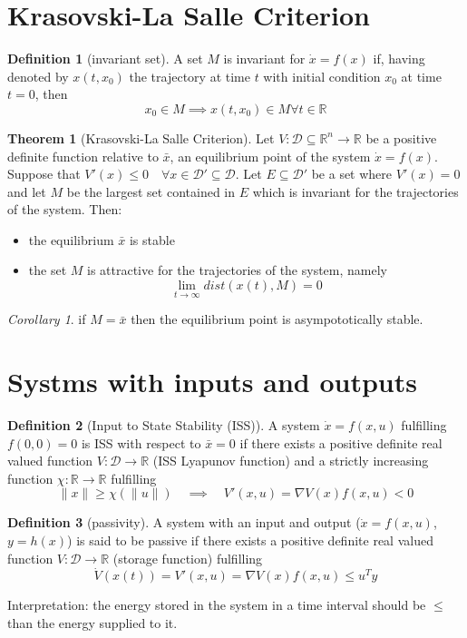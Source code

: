 \documentclass{book}
\newcommand{\R}{\mathbb{R}}
\theoremstyle{definition}
\newtheorem{definition}{Definition}[section]
\newtheorem{theorem}{Theorem}[section]
\theoremstyle{remark}
\theoremstyle{remark}
\newtheorem*{corollary}{Corollary}
\begin{document}
\section{Krasovski-La Salle Criterion}


\begin{definition}[invariant set]
    A set $M$ is invariant for $\dot{x}=f(x)$ if, having denoted by $x(t,x_0)$ the trajectory at time $t$ with initial condition $x_0$ at time $t=0$, then
    \[
        x_0\in M \implies x(t,x_0)\in M \forall t \in \R
    \]    
\end{definition}

\begin{theorem}[Krasovski-La Salle Criterion]
    Let $V:\mathcal{D}\subseteq \R^n\to\R$ be a positive definite function relative to $\bar{x}$, an equilibrium point of the system $\dot{x}=f(x)$. Suppose that $V'(x)\leq 0 \quad \forall x\in\mathcal{D}'\subseteq \mathcal{D}$. Let $E\subseteq \mathcal{D}'$ be a set where $V'(x)=0$ and let $M$ be the largest set contained in $E$ which is invariant for the trajectories of the system. Then:
    \begin{itemize}
        \item the equilibrium $\bar{x}$ is stable
        \item the set $M$ is attractive for the trajectories of the system, namely \[\lim_{t\to\infty}dist(x(t),M)=0\]
    \end{itemize}
\end{theorem}
\begin{corollary}
    if $M=\bar{x}$ then the equilibrium point is asympototically stable.
\end{corollary}

\section{Systms with inputs and outputs}
\begin{definition}[Input to State Stability (ISS)]
    A system $\dot{x}=f(x,u)$ fulfilling $f(0,0)=0$ is ISS with respect to $\bar{x}=0$ if there exists a positive definite real valued function $V:\mathcal{D}\to \R$ (ISS Lyapunov function) and a strictly increasing function $\chi:\R\to\R$ fulfilling 
    \[
        \|x\|\geq\chi(\|u\|) \quad \implies \quad V'(x,u)= \nabla V(x)f(x,u)<0
    \]
\end{definition}

\begin{definition}[passivity]
    A system with an input and output ($\dot{x}=f(x,u)$, $y=h(x)$) is said to be passive if there exists a positive definite real valued function $V:\mathcal{D}\to\R$ (storage function) fulfilling
    \[
        \dot{V}(x(t))=V'(x,u)=\nabla V(x)f(x,u)\leq u^Ty
    \]
\end{definition}
Interpretation: the energy stored in the system in a time interval should be $\leq$ than the energy supplied to it.
\end{document}
